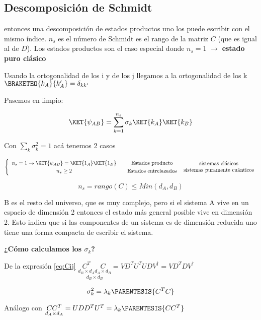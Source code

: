 \subsection{Descomposición de Schmidt}

entonces una descomposición de estados productos uno los puede escribir
con el mismo índice. $n_{s}$ es el número de Schmidt es el rango
de la matriz $C$ (que es igual al de $D$). Los estados productos
son el caso especial donde $n_{s}=1$ $\rightarrow$ \textbf{estado
puro clásico}

Usando la ortogonalidad de los i y de los j llegamos a la ortogonalidad
de los k $\BRAKETEO{k_{A}}{k'_{A}}=\delta_{kk'}$

Pasemos en limpio:

\[
\KET{\psi_{AB}}=\sum_{k=1}^{n_{s}}\sigma_{k}\KET{k_{A}}\KET{k_{B}}
\]

Con $\sum_{k}\sigma_{k}^{2}=1$ acá tenemos 2 casos

$\begin{cases}
\begin{array}{c}
n_{s}=1\rightarrow\KET{\psi_{AB}}=\KET{1_{A}}\KET{1_{B}}\\
n_{s}\geq2
\end{array} & \begin{array}{c}
\text{Estados producto}\\
\text{Estados entrelazados}
\end{array}\end{cases}\begin{array}{c}
\text{sistemas clásicos}\\
\text{sistemas puramente cuánticos}
\end{array}$

\[
n_{s}=rango(C)\leq Min(d_{A},d_{B})
\]

B es el resto del universo, que es muy complejo, pero si el sistema
A vive en un espacio de dimensión 2 entonces el estado más general
posible vive en dimensión 2. Esto indica que si las componentes de
un sistema es de dimensión reducida uno tiene una forma compacta de
escribir el sistema. 

\textbf{¿Cómo calculamos los $\sigma_{k}$?}

De la expresión \ref{eq:Cij} $\underset{d_{B}\times d_{B}}{\underset{d_{B}\times d_{A}}{C^{T}}\underset{d_{A}\times d_{B}}{C}}=VD^{T}U^{T}UDV^{\dagger}=VD^{T}DV^{\dagger}$

\[
\sigma_{k}^{2}=\lambda_{k}\PARENTESIS{C^{T}C}
\]

Análogo con $\underset{d_{A}\times d_{A}}{CC^{T}}=UDD^{T}U^{T}=\lambda_{k}\PARENTESIS{CC^{T}}$ 

